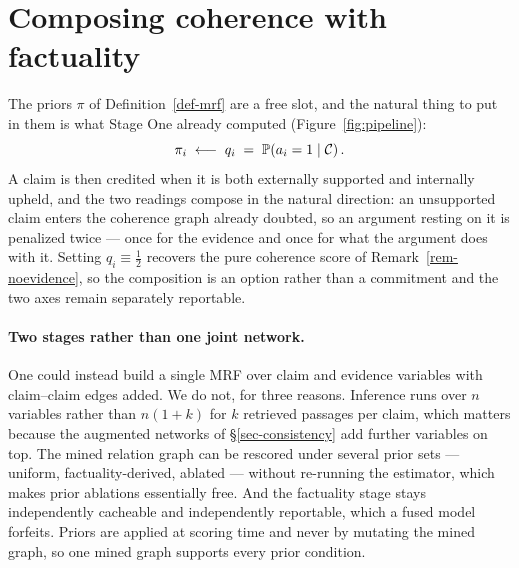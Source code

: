 \section{Composing coherence with factuality}
\label{sec-twostage}

The priors $\pi$ of Definition~\ref{def-mrf} are a free slot, and the natural thing to put in them is
what Stage One already computed (Figure~\ref{fig:pipeline}):
\begin{equation}
\pi_i \;\longleftarrow\; q_i \;=\; \mathbb{P}\!\left( a_i=1 \mid \mathcal{C} \right) .
\label{eq-priors}
\end{equation}
A claim is then credited when it is both externally supported and internally upheld, and the two
readings compose in the natural direction: an unsupported claim enters the coherence graph already
doubted, so an argument resting on it is penalized twice --- once for the evidence and once for what
the argument does with it. Setting $q_i\equiv\tfrac12$ recovers the pure coherence score of
Remark~\ref{rem-noevidence}, so the composition is an option rather than a commitment and the two
axes remain separately reportable.

\paragraph{Two stages rather than one joint network.} One could instead build a single MRF over claim
and evidence variables with claim--claim edges added. We do not, for three reasons. Inference runs
over $n$ variables rather than $n(1+k)$ for $k$ retrieved passages per claim, which matters because
the augmented networks of \S\ref{sec-consistency} add further variables on top. The mined relation
graph can be rescored under several prior sets --- uniform, factuality-derived, ablated --- without
re-running the estimator, which makes prior ablations essentially free. And the factuality stage
stays independently cacheable and independently reportable, which a fused model forfeits. Priors are
applied at scoring time and never by mutating the mined graph, so one mined graph supports every
prior condition.

